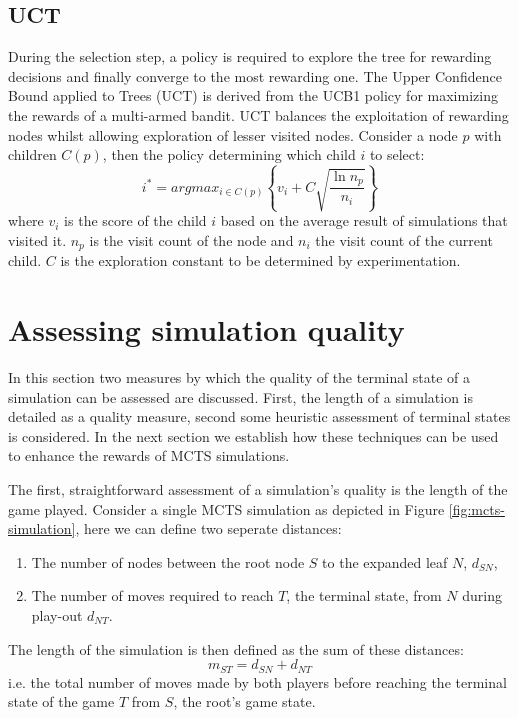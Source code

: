 \documentclass{ecai2010}
\begin{document}
\subsection{UCT}
\label{subsec:uct}
During the selection step, a policy is required to explore the tree for rewarding decisions and finally converge to the most rewarding one. The Upper Confidence Bound applied to Trees (UCT) \cite{kocsis2006bandit} is derived from the UCB1 policy \cite{auer2002using} for maximizing the rewards of a multi-armed bandit. UCT balances the exploitation of rewarding nodes whilst allowing exploration of lesser visited nodes. Consider a node $p$ with children $C(p)$, then the policy determining which child $i$ to select:
\begin{equation}
\label{eq:uct}
i^* = argmax_{i \in C(p)}\left\{ v_i + C \sqrt{ \frac{\ln{n_p}}{n_i}}\right\}
\end{equation}
where $v_i$ is the score of the child $i$ based on the average result of simulations that visited it. $n_p$ is the visit count of the node and $n_i$ the visit count of the current child. $C$ is the exploration constant to be determined by experimentation.

\section{Assessing simulation quality}
\label{sec:poqual}

In this section two measures by which the quality of the terminal state of a simulation can be assessed are discussed. First, the length of a simulation is detailed as a quality measure, second some heuristic assessment of terminal states is considered. In the next section we establish how these techniques can be used to enhance the rewards of MCTS simulations.

The first, straightforward assessment of a simulation's quality is the length of the game played. Consider a single MCTS simulation as depicted in Figure \ref{fig:mcts-simulation}, here we can define two seperate distances: 
\begin{enumerate}
\item The number of nodes between the root node $S$ to the expanded leaf $N$, $d_{SN}$,
\item The number of moves required to reach $T$, the terminal state, from $N$ during play-out $d_{NT}$.
\end{enumerate}
The length of the simulation is then defined as the sum of these distances:
\begin{equation}
m_{ST} = d_{SN} + d_{NT}
\label{eq:m_ST}
\end{equation}
i.e. the total number of moves made by both players before reaching the terminal state of the game $T$ from $S$, the root's game state.
\end{document}
